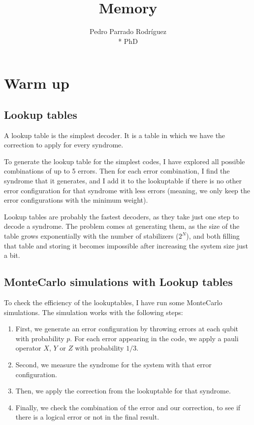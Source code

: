 \documentclass[a4paper,12pt]{article}
\author{Pedro Parrado Rodríguez\\* {\small PhD}}
\title{{\bf{Memory}}}
\date{{\scriptsize }}
\begin{document}
\maketitle

\tableofcontents
\newpage


\section{Warm up}
\subsection{Lookup tables}

A lookup table is the simplest decoder. It is a table in which we have the correction to apply for every syndrome. 

To generate the lookup table for the simplest codes, I have explored all possible combinations of up to 5 errors. Then for each error combination, I find the syndrome that it generates, and I add it to the lookuptable if there is no other error configuration for that syndrome with less errors (meaning, we only keep the error configurations with the minimum weight).

Lookup tables are probably the fastest decoders, as they take just one step to decode a syndrome. The problem comes at generating them, as the size of the table grows exponentially with the number of stabilizers ($2^N$), and both filling that table and storing it becomes impossible after increasing the system size just a bit. 

\subsection{MonteCarlo simulations with Lookup tables}

To check the efficiency of the lookuptables, I have run some MonteCarlo simulations. The simulation works with the following steps:
\begin{enumerate}
\item First, we generate an error configuration by throwing errors at each qubit with probability $p$. For each error appearing in the code, we apply a pauli operator $X$, $Y$ or $Z$ with probability $1/3$.
\item Second, we measure the syndrome for the system with that error configuration.
\item Then, we apply the correction from the lookuptable for that syndrome.
\item Finally, we check the combination of the error and our correction, to see if there is a logical error or not in the final result.
\end{enumerate}
\end{document}
